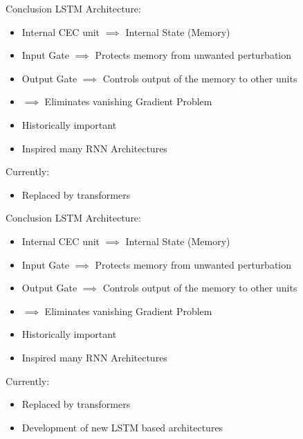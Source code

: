 \documentclass[10pt, aspectratio=169]{beamer}
\begin{document}
\begin{frame}[t]{Conclusion}
LSTM Architecture:
\begin{itemize}
    \item Internal CEC unit \begin{math}\implies \end{math} Internal State (Memory)
    \item Input Gate \begin{math}\implies\end{math} Protects memory from unwanted perturbation
    \item Output Gate \begin{math}\implies\end{math} Controls output of the memory to other units
    \item \begin{math}\implies\end{math} Eliminates vanishing Gradient Problem
    \item Historically important 
    \item Inspired many RNN Architectures
\end{itemize}
Currently:
\begin{itemize}
    \item Replaced by transformers
\end{itemize}
\end{frame}

\begin{frame}[t]{Conclusion}
LSTM Architecture:
\begin{itemize}
    \item Internal CEC unit \begin{math}\implies \end{math} Internal State (Memory)
    \item Input Gate \begin{math}\implies\end{math} Protects memory from unwanted perturbation
    \item Output Gate \begin{math}\implies\end{math} Controls output of the memory to other units
    \item \begin{math}\implies\end{math} Eliminates vanishing Gradient Problem
    \item Historically important 
    \item Inspired many RNN Architectures
\end{itemize}
Currently:
\begin{itemize}
    \item Replaced by transformers
    \item Development of new LSTM based architectures
\end{itemize}
\end{frame}
\end{document}
